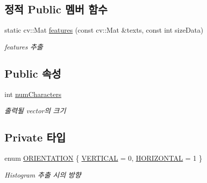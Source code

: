 \subsection*{정적 Public 멤버 함수}
\begin{DoxyCompactItemize}
\item 
static cv\+::\+Mat \hyperlink{class_o_c_r_ada88a7c2579124895eb6f19383749e9c}{features} (const cv\+::\+Mat \&texts, const int size\+Data)
\begin{DoxyCompactList}\small\item\em features 추출 \end{DoxyCompactList}\end{DoxyCompactItemize}
\subsection*{Public 속성}
\begin{DoxyCompactItemize}
\item 
\mbox{\label{class_o_c_r_a9e52aa42898bfdaeef338e1ac6507233}} 
int \hyperlink{class_o_c_r_a9e52aa42898bfdaeef338e1ac6507233}{num\+Characters}
\begin{DoxyCompactList}\small\item\em 출력될 vector의 크기 \end{DoxyCompactList}\end{DoxyCompactItemize}
\subsection*{Private 타입}
\begin{DoxyCompactItemize}
\item 
enum \hyperlink{class_o_c_r_ad50a9d013dc2ee50341eee5b9e326686}{O\+R\+I\+E\+N\+T\+A\+T\+I\+ON} \{ \hyperlink{class_o_c_r_ad50a9d013dc2ee50341eee5b9e326686a6df62411d3b46574d518ec4d6be10a89}{V\+E\+R\+T\+I\+C\+AL} = 0, 
\hyperlink{class_o_c_r_ad50a9d013dc2ee50341eee5b9e326686a9561e34d3db489309a61726ba3e523fe}{H\+O\+R\+I\+Z\+O\+N\+T\+AL} = 1
 \}\begin{DoxyCompactList}\small\item\em Histogram 추출 시의 방향 \end{DoxyCompactList}
\end{DoxyCompactItemize}
